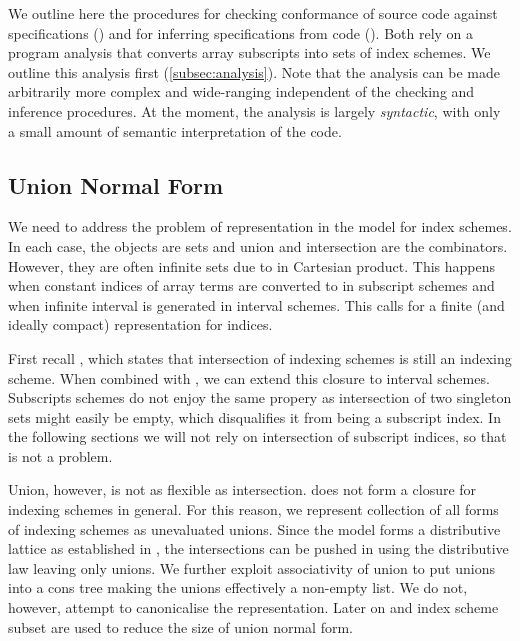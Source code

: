 %
We outline here the procedures for checking conformance
of source code against specifications ()
and for inferring specifications from code ().
Both rely on a program analysis that converts array subscripts
 into sets of index schemes. We outline this analysis
first (\cref{subsec:analysis}). Note that the analysis
can be made arbitrarily more complex and wide-ranging independent
of the checking and inference procedures. At the moment, the analysis
is largely \emph{syntactic}, with only a small amount of
semantic interpretation of the code.

\subsection{Union Normal Form}\label{subsec:union-normal-form}

We need to address the problem of representation in the model for index schemes.
In each case, the objects are sets and union and intersection are the
combinators. However, they are often infinite sets due to \bz{} in Cartesian
product. This happens when constant indices of array terms are converted to
\bz{} in subscript schemes and when infinite interval is generated in interval
schemes. This calls for a finite (and ideally compact) representation for
indices.

First recall , which states that intersection of
indexing schemes is still an indexing scheme. When combined with
, we can extend this closure to interval schemes.
Subscripts schemes do not enjoy the same propery as intersection of two
singleton sets might easily be empty, which disqualifies it from being a
subscript index. In the following sections we will not rely on intersection of
subscript indices, so that is not a problem.

Union, however, is not as flexible as intersection.  does
not form a closure for indexing schemes in general. For this reason, we
represent collection of all forms of indexing schemes as unevaluated unions.
Since the model forms a distributive lattice as established in
, the intersections can be pushed in using the
distributive law leaving only unions. We further exploit associativity of union
to put unions into a cons tree making the unions effectively a non-empty list.
We do not, however, attempt to canonicalise the representation. Later on
 and index scheme subset are used to reduce the size of
union normal form.


